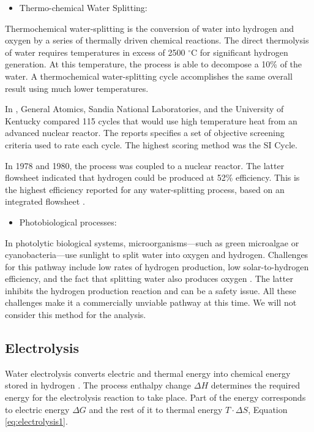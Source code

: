 \documentclass[11pt,letterpaper]{article}
\begin{document}
\begin{itemize}
	\item Thermo-chemical Water Splitting:
\end{itemize}

Thermochemical water-splitting is the conversion of water into hydrogen and oxygen by a series of thermally driven chemical reactions.
The direct thermolysis of water requires temperatures in excess of 2500 $^{\circ}$C for significant hydrogen generation.
At this temperature, the process is able to decompose a 10\% of the water.
A thermochemical water-splitting cycle accomplishes the same overall result using much lower temperatures.

In \cite{brown_high_2003}, General Atomics, Sandia National Laboratories, and the University of Kentucky compared 115 cycles that would use high temperature heat from an advanced nuclear reactor.
The reports specifies a set of objective screening criteria used to rate each cycle.
The highest scoring method was the \gls{SI} Cycle.

In 1978 and 1980, the process was coupled to a nuclear reactor.
The latter flowsheet indicated that hydrogen could be produced at 52\% efficiency.
This is the highest efficiency reported for any water-splitting process, based on an integrated flowsheet \cite{brown_high_2003}.

\begin{itemize}
	\item Photobiological processes:
\end{itemize}

In photolytic biological systems, microorganisms—such as green microalgae or cyanobacteria—use sunlight to split water into oxygen and hydrogen.
Challenges for this pathway include low rates of hydrogen production, low solar-to-hydrogen efficiency, and the fact that splitting water also produces oxygen \cite{doe_office_of_energy_efficiency_and_renewable_energy_hydrogen_2020}.
The latter inhibits the hydrogen production reaction and can be a safety issue.
All these challenges make it a commercially unviable pathway at this time.
We will not consider this method for the analysis.

\subsection{Electrolysis}

Water electrolysis converts electric and thermal energy into chemical energy stored in hydrogen \cite{hi2h2_highly_2007}.
The process enthalpy change $\Delta H$ determines the required energy for the electrolysis reaction to take place.
Part of the energy corresponds to electric energy $\Delta G$ and the rest of it to thermal energy $T \cdot \Delta S$, Equation \ref{eq:electrolysis1}.
\end{document}

